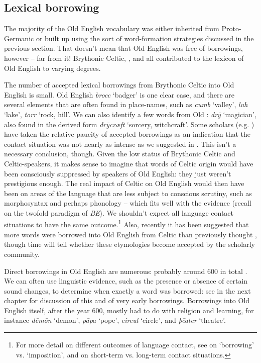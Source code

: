 \subsection{Lexical borrowing}\label{OE-borrowing}
\largerpage[-1]
The majority of the Old English vocabulary was either inherited from Proto-Germanic or built up using the sort of word-formation strategies discussed in the previous section. That doesn't mean that Old English was free of borrowings, however -- far from it! Brythonic Celtic, , and  all contributed to the lexicon of Old English to varying degrees.

The number of accepted lexical borrowings from Brythonic Celtic into Old English is small. Old English \emph{brocc} `badger' is one clear case, and there are several elements that are often found in place-names, such as \emph{cumb} `valley', \emph{luh} `lake', \emph{torr} `rock, hill'. We can also identify a few words from Old : \emph{drȳ} `magician', also found in the derived form \emph{drȳcræft} `sorcery, witchcraft'. Some scholars (e.g. \citealp{Coates2017}) have taken the relative paucity of accepted borrowings as an indication that the contact situation was not nearly as intense as we suggested in . This isn't a necessary conclusion, though. Given the low status of Brythonic Celtic and Celtic-speakers, it makes sense to imagine that words of Celtic origin would have been consciously suppressed by speakers of Old English: they just weren't prestigious enough. The real impact of Celtic on Old English would then have been on areas of the language that are less subject to conscious scrutiny, such as morphosyntax and perhaps phonology -- which fits well with the evidence (recall  on the twofold paradigm of \textit{BE}). We shouldn't expect all language contact situations to have the same outcome.\footnote{For more detail on different outcomes of language contact, see \citet{Winford2005} on `borrowing' vs. `imposition', and \citet{Trudgill2011} on short-term vs. long-term contact situations.} Also, recently it has been suggested that more words were borrowed into Old English from Celtic than previously thought \citep{Breeze2002}, though time will tell whether these etymologies become accepted by the scholarly community.

Direct  borrowings in Old English are numerous: probably around 600 in total \citep[100]{Durkin2014}. We can often use linguistic evidence, such as the presence or absence of certain sound changes, to determine when exactly a word was borrowed: see  in the next chapter for discussion of this and of very early borrowings. Borrowings into Old English itself, after the year 600, mostly had to do with religion and learning, for instance \emph{dēmōn} `demon', \emph{pāpa} `pope', \emph{circul} `circle', and \emph{þēater} `theatre'.

